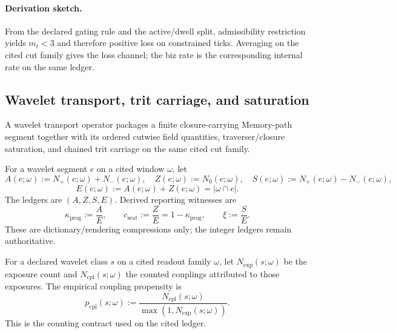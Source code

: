 \paragraph{Derivation sketch.} From the declared gating rule and the active/dwell split, admissibility restriction yields $m_t<3$ and therefore positive loss on constrained ticks. Averaging on the cited cut family gives the loss channel; the biz rate is the corresponding internal rate on the same ledger.

\subsection{Wavelet transport, trit carriage, and saturation}\label{subsec:wavelet-transport-saturation}
\begin{definition}
\label{def:wavelet-transport-operator}
A wavelet transport operator packages a finite closure-carrying Memory-path segment together with its ordered cutwise field quantities, traverser/closure saturation, and chained trit carriage on the same cited cut family.
\end{definition}

\begin{definition}
\label{def:wavelet-mode-witness}
For a wavelet segment $e$ on a cited window $\omega$, let
\[
A(e;\omega):=N_+(e;\omega)+N_-(e;\omega),\quad Z(e;\omega):=N_0(e;\omega),\quad S(e;\omega):=N_+(e;\omega)-N_-(e;\omega),
\]
\[
E(e;\omega):=A(e;\omega)+Z(e;\omega)=|\omega\cap e|.
\]
The ledgers are $(A,Z,S,E)$. Derived reporting witnesses are
\[
\kappa_{\mathrm{prog}}:=\frac{A}{E},\qquad c_{\mathrm{seat}}:=\frac{Z}{E}=1-\kappa_{\mathrm{prog}},\qquad \xi:=\frac{S}{E}.
\]
These are dictionary/rendering compressions only; the integer ledgers remain authoritative.
\end{definition}

\begin{definition}
\label{def:coupling-exposure}
For a declared wavelet class $s$ on a cited readout family $\omega$, let $N_{\mathrm{exp}}(s;\omega)$ be the exposure count and $N_{\mathrm{cpl}}(s;\omega)$ the counted couplings attributed to those exposures. The empirical coupling propensity is
\[
p_{\mathrm{cpl}}(s;\omega):=\frac{N_{\mathrm{cpl}}(s;\omega)}{\max(1,N_{\mathrm{exp}}(s;\omega))}.
\]
This is the counting contract used on the cited ledger.
\end{definition}


